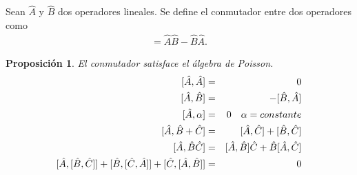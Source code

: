 \documentclass[letterpaper,12pt,oneside]{book}
\newtheorem{proposition}{Proposici\'on}[section]
\begin{document}
Sean $\hat A$ y $\hat B$ dos operadores lineales.  Se define el conmutador entre dos operadores como 
%
\begin{eqnarray}
[{\hat {A}},{\hat {B}}]={\hat {A}}{\hat {B}}-{\hat {B}}{\hat {A}}.
\end{eqnarray}
%
\begin{proposition}
El conmutador satisface el \'algebra de Poisson.
%
\begin{eqnarray}
\protect [\hat A, \hat A] &=& 0 \label{conm1}\\
\protect [\hat A, \hat B] &=& - [\hat B,\hat A] \label{conm2}\\
\protect [\hat A, \alpha] &=& 0 \quad \alpha=constante\label{conm3}\\
\protect[\hat A, \hat B + \hat C] &=& [\hat A, \hat C] + [\hat B, \hat C]\label{conm4}\\
\protect[\hat A, \hat B\hat C] &=& [\hat A, \hat B]\hat C +  \hat B[\hat A,\hat C]\label{conm5}\\
\protect[\hat A, [\hat B,\hat C]] + [\hat B, [\hat C,\hat A]] + [\hat C, [\hat A,\hat B]] &=& 0\label{conm6}
\end{eqnarray}
%
\end{proposition}
%
\end{document}
